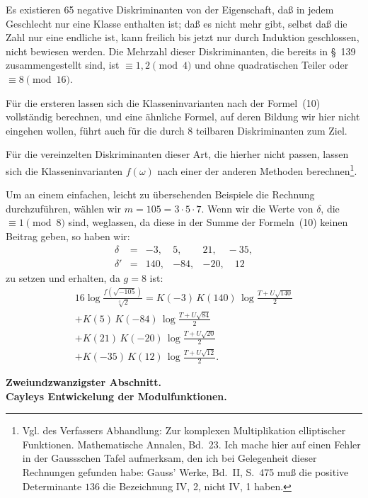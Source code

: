 \documentclass[12pt,a4paper]{article}
\theoremstyle{definition}
\begin{document}
Es existieren 65 negative Diskriminanten von der Eigenschaft, daß in jedem 
Geschlecht nur eine Klasse enthalten ist; daß es nicht mehr gibt, selbst 
daß die Zahl nur eine endliche ist, kann freilich bis jetzt nur durch 
Induktion geschlossen, nicht bewiesen werden. Die Mehrzahl dieser 
Diskriminanten, die bereits in \S~139 zusammengestellt sind, ist 
$\equiv 1, 2 \pmod 4$ und ohne quadratischen Teiler oder $\equiv 8 \pmod{16}$.

Für die ersteren lassen sich die Klasseninvarianten nach der Formel~(10) 
vollständig berechnen, und eine ähnliche Formel, auf deren Bildung wir hier 
nicht eingehen wollen, führt auch für die durch $8$ teilbaren 
Diskriminanten zum Ziel.

Für die vereinzelten Diskriminanten dieser Art, die hierher nicht passen, 
lassen sich die Klasseninvarianten $f(\omega)$ nach einer der anderen 
Methoden berechnen\footnote{Vgl. des Verfassers Abhandlung: \glqq{}Zur 
komplexen Multiplikation elliptischer Funktionen\grqq{}. Mathematische 
Annalen, Bd.~23. Ich mache hier auf einen Fehler in der Gaussschen Tafel 
aufmerksam, den ich bei Gelegenheit dieser Rechnungen gefunden habe: 
Gauss' Werke, Bd.~II, S.~475 muß die positive Determinante $136$ die 
Bezeichnung IV, 2, nicht IV, 1 haben.}.

Um an einem einfachen, leicht zu übersehenden Beispiele die Rechnung 
durchzuführen, wählen wir $m = 105 = 3\cdot 5\cdot 7$. Wenn wir die Werte 
von $\delta$, die $\equiv 1 \pmod 8$ sind, weglassen, da diese in der Summe 
der Formeln~(10) keinen Beitrag geben, so haben wir:
\[
\begin{array}{rcccc}
\delta & = & -3, & 5, & 21,\quad -35,\\
\delta' & = & 140, & -84, & -20,\quad 12
\end{array}
\]
zu setzen und erhalten, da $g = 8$ ist:
\begin{multline*}
16\log\frac{f(\sqrt{-105})}{\sqrt[4]{2}} =
K(-3)\,K(140)\,\log\frac{T + U\sqrt{140}}{2}\\
+ K(5)\,K(-84)\,\log\frac{T + U\sqrt{84}}{2}\\
+ K(21)\,K(-20)\,\log\frac{T + U\sqrt{20}}{2}\\
+ K(-35)\,K(12)\,\log\frac{T + U\sqrt{12}}{2}.
\end{multline*}

\clearpage
\begin{center}
\Large\textbf{Zweiundzwanzigster Abschnitt.}\\[6pt]
\Large\textbf{Cayleys Entwickelung der Modulfunktionen.}
\end{center}
\end{document}
